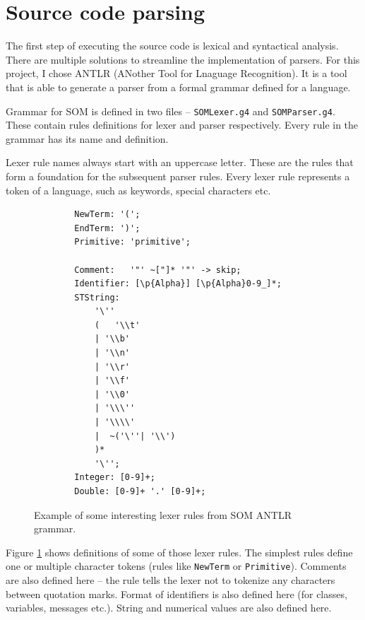 \documentclass[thesis=M,english]{FITthesis}[2019/12/23]
\begin{document}
\section{Source code parsing}
The first step of executing the source code is lexical and syntactical analysis. There are multiple solutions to streamline the
implementation of parsers. For this project, I chose ANTLR (ANother Tool for Lnaguage Recognition). It is a tool that is able
to generate a parser from a formal grammar defined for a language.

Grammar for SOM is defined in two files -- \texttt{SOMLexer.g4} and \texttt{SOMParser.g4}. These contain rules definitions for
lexer and parser respectively. Every rule in the grammar has its name and definition.

Lexer rule names always start with an uppercase letter. These are the rules that form a foundation for the subsequent parser rules.
Every lexer rule represents a token of a language, such as keywords, special characters etc. 

\begin{figure}
	\centering
	\begin{verbatim}
		NewTerm: '(';
		EndTerm: ')';
		Primitive: 'primitive';

		Comment:   '"' ~["]* '"' -> skip;
		Identifier: [\p{Alpha}] [\p{Alpha}0-9_]*;
		STString:
    		'\''
    		(   '\\t'
      		| '\\b'
      		| '\\n'
      		| '\\r'
      		| '\\f'
      		| '\\0'
      		| '\\\''
      		| '\\\\'
      		|  ~('\''| '\\')
    		)*
    		'\'';
		Integer: [0-9]+;
		Double: [0-9]+ '.' [0-9]+;	
	\end{verbatim}
	\caption{Example of some interesting lexer rules from SOM ANTLR grammar.}
	\label{fig:antlr_lexer}
\end{figure}

Figure \ref{fig:antlr_lexer} shows definitions of some of those lexer rules. The simplest rules define one or multiple character
tokens (rules like \texttt{NewTerm} or \texttt{Primitive}). Comments are also defined here -- the rule tells the lexer not to tokenize
any characters between quotation marks. Format of identifiers is also defined here (for classes, variables, messages etc.). String
and numerical values are also defined here.
\end{document}
